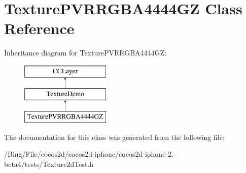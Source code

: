 \hypertarget{interface_texture_p_v_r_r_g_b_a4444_g_z}{\section{Texture\-P\-V\-R\-R\-G\-B\-A4444\-G\-Z Class Reference}
\label{interface_texture_p_v_r_r_g_b_a4444_g_z}
}
Inheritance diagram for Texture\-P\-V\-R\-R\-G\-B\-A4444\-G\-Z\-:\begin{figure}[H]
\begin{center}
\leavevmode
\includegraphics[height=3.000000cm]{interface_texture_p_v_r_r_g_b_a4444_g_z}
\end{center}
\end{figure}


The documentation for this class was generated from the following file\-:\begin{DoxyCompactItemize}
\item 
/\-Bing/\-File/cocos2d/cocos2d-\/iphone/cocos2d-\/iphone-\/2.-\/beta4/tests/Texture2d\-Test.\-h\end{DoxyCompactItemize}
